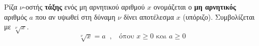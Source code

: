 Ρίζα $ \nu $-οστής \textbf{τάξης} ενός μη αρνητικού αριθμού $ x $ ονομάζεται ο \textbf{μη αρνητικός} αριθμός $ a $ που αν υψωθεί στη δύναμη $ \nu $ δίνει αποτέλεσμα $ x $ (υπόριζο). Συμβολίζεται με $ \sqrt[\nu]{x} $.
\[ \sqrt[\nu]{x}=a\;\;,\;\;\textrm{ όπου }x\geq0\textrm{ και }a\geq0 \]
